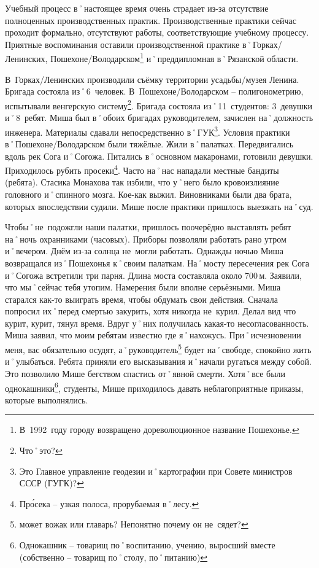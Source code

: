 Учебный процесс в˚настоящее время очень страдает из-за отсутствие полноценных производственных практик. Производственные практики сейчас проходит формально, отсутствуют работы, соответствующие учебному процессу. Приятные воспоминания оставили производственной практике в˚Горках\-/Ленинских, Пошехоне\-/Володарском\footnote{В~1992~году городу возвращено дореволюционное название Пошехонье.} и˚преддипломная в˚Рязанской области.

В~Горках\-/Ленинских производили съёмку территории усадьбы\-/музея Ленина. Бригада состояла из˚6~человек. В~Пошехоне\-/Володарском \--- полигонометрию, испытывали венгерскую систему\footnote{Что˚это?}. Бригада состояла из˚11~студентов: 3~девушки и˚8~ребят. Миша был в˚обоих бригадах руководителем, зачислен на˚должность инженера. Материалы сдавали непосредственно в˚ГУК\footnote{Это Главное управление геодезии и˚картографии при Совете министров СССР (ГУГК)?}. Условия практики в˚Пошехоне\-/Володарском были тяжёлые. Жили в˚палатках. Передвигались вдоль рек Сога и˚Согожа. Питались в˚основном макаронами, готовили девушки. Приходилось рубить просеки\footnote{Пр\'{о}сека \--- узкая полоса, прорубаемая в˚лесу.}. Часто на˚нас нападали местные бандиты (ребята). Стасика Монахова так избили, что у˚него было кровоизлияние головного и˚спинного мозга. Кое-как выжил. Виновниками были два брата, которых впоследствии судили. Мише после практики пришлось выезжать на˚суд. 

Чтобы˚не~подожгли наши палатки, пришлось поочерёдно выставлять ребят на˚ночь охранниками (часовых). Приборы позволяли работать рано утром и˚вечером. Днём из-за солнца не~могли работать. Однажды ночью Миша возвращался из˚Пошехонья к˚своим палаткам. На˚мосту пересечения рек Сога и˚Согожа встретили три парня. Длина моста составляла около 700\,м. Заявили, что мы˚сейчас тебя утопим. Намерения были вполне серьёзными. Миша старался как-то выиграть время, чтобы обдумать свои действия. Сначала попросил их˚перед смертью закурить, хотя никогда не~курил. Делал вид что курит, курит, тянул время. Вдруг у˚них получилась какая-то несогласованность. Миша заявил, что моим ребятам известно где я˚нахожусь. При˚исчезновении меня, вас обязательно осудят, а˚руководитель\footnote{может вожак или главарь? Непонятно почему он не~сядет?} будет на˚свободе, спокойно жить и˚улыбаться. Ребята приняли его высказывания и˚начали ругаться между собой. Это позволило Мише бегством спастись от˚явной смерти. Хотя˚все были однокашники\footnote{Однокашник \--- товарищ по˚воспитанию, учению, выросший вместе (собственно \--- товарищ по˚столу, по˚питанию)}, студенты, Мише приходилось давать неблагоприятные приказы, которые выполнялись.

